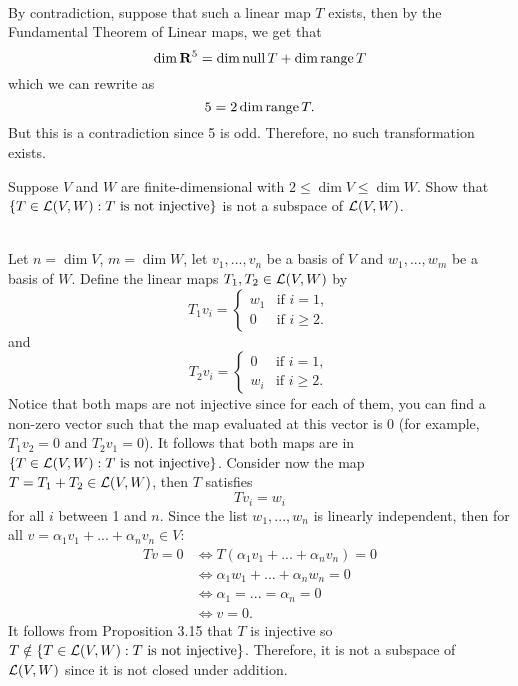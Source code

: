 \begin{solution}
    \\ By contradiction, suppose that such a linear map $T$ exists, then by the Fundamental Theorem of Linear maps, we get that 
    $$\dim \mathbf{R}^5 = \dim \operatorname{\text{null}} T + \dim \operatorname{\text{range}} T$$
    which we can rewrite as 
    $$5 = 2 \dim \operatorname{\text{range}} T.$$
    But this is a contradiction since 5 is odd. Therefore, no such transformation exists. \\
\end{solution}

\begin{exercise}
    Suppose $V$ and $W$ are finite-dimensional with $2 \leq \dim V \leq \dim W$. Show that $\{T \in \mathcal{L}(V,W) : T \text{ is not injective}\}$ is not a subspace of $\mathcal{L}(V,W)$. \\
\end{exercise}

\begin{solution}
    \\ Let $n = \dim V$, $m = \dim W$, let $v_1, ..., v_n$ be a basis of $V$ and $w_1, ..., w_m$ be a basis of $W$. Define the linear maps $T_1, T_2 \in \mathcal{L}(V,W)$ by
    $$T_1 v_i = \begin{cases} w_1 & \text{if } i= 1, \\ 0 & \text{if } i \geq 2. \end{cases}$$
    and
    $$T_2 v_i = \begin{cases} 0 & \text{if } i= 1, \\ w_i & \text{if } i \geq 2. \end{cases}$$
    Notice that both maps are not injective since for each of them, you can find a non-zero vector such that the map evaluated at this vector is 0 (for example, $T_1v_2 = 0$ and $T_2 v_1 = 0$). It follows that both maps are in $\{T \in \mathcal{L}(V,W) : T \text{ is not injective}\}$. Consider now the map $T = T_1 + T_2 \in \mathcal{L}(V,W)$, then $T$ satisfies
    $$T v_i = w_i$$
    for all $i$ between 1 and $n$. Since the list $w_1, ..., w_n$ is linearly independent, then for all $v = \alpha_1 v_1 + ... + \alpha_n v_n \in V$:
    \begin{align*}
        Tv = 0 &\iff T(\alpha_1 v_1 + ... + \alpha_n v_n) = 0 \\
        &\iff \alpha_1 w_1 + ... + \alpha_n w_n = 0 \\
        &\iff \alpha_1 = ... =  \alpha_n = 0 \\
        &\iff v = 0.
    \end{align*}
    It follows from Proposition 3.15 that $T$ is injective so $T \notin \{T \in \mathcal{L}(V,W) : T \text{ is not injective}\}$. Therefore, it is not a subspace of $\mathcal{L}(V,W)$ since it is not closed under addition.\\
\end{solution}

